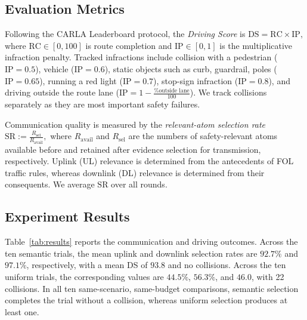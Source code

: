 \documentclass[10pt, conference, letterpaper]{ IEEEtran}
\theoremstyle{bfnote}
\begin{document}
\subsection{Evaluation Metrics}

Following the CARLA Leaderboard protocol, the
\emph{Driving Score} is
$
    \mathrm{DS}
    =
    \mathrm{RC}\times\mathrm{IP},
$
where $\mathrm{RC}\in[0,100]$ is route completion and $\mathrm{IP}\in[0,1]$
is the multiplicative infraction penalty. Tracked infractions include collision with a pedestrian ($\mathrm{IP} = 0.5$), vehicle ($\mathrm{IP} = 0.6$), static objects such as curb, guardrail, poles ($\mathrm{IP} = 0.65$), running a red light ($\mathrm{IP} = 0.7$), stop-sign infraction ($\mathrm{IP} = 0.8$), and driving outside the route lane ($\mathrm{IP} = 1 - \frac{\% \text{outside lane} }{100}$). We track
collisions separately as they are most important safety failures.

Communication quality is measured by the \emph{relevant-atom selection
rate}
$
    \mathrm{SR}
    :=
    \frac{R_{\mathrm{sel}}}{R_{\mathrm{avail}}},
$
where $R_{\mathrm{avail}}$ and $R_{\mathrm{sel}}$ are the numbers of
safety-relevant atoms available before and retained after evidence selection for transmission,
respectively. Uplink (UL) relevance is determined from the antecedents of FOL traffic
rules, whereas downlink (DL) relevance is determined from their consequents. We average
$\mathrm{SR}$ over all rounds.

\subsection{Experiment Results}

Table~\ref{tab:results} reports the communication and driving outcomes.
Across the ten semantic trials, the mean uplink and downlink selection
rates are $92.7\%$ and $97.1\%$, respectively, with a mean DS of $93.8$
and no collisions. Across the ten uniform trials, the corresponding values
are $44.5\%$, $56.3\%$, and $46.0$, with 22 collisions. In all ten
same-scenario, same-budget comparisons, semantic selection completes the
trial without a collision, whereas uniform selection produces at least one.
\end{document}
